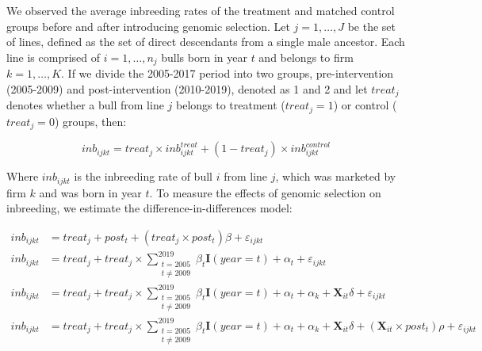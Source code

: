 \documentclass[12pt,letterpaper]{article}
\begin{document}


We observed the average inbreeding rates of the treatment and matched control groups before and after introducing genomic selection.  Let $j=1,\dots, J$ be the set of lines, defined as the set of direct descendants from a single male ancestor. Each line is comprised of $i=1,\dots,n_{j}$ bulls born in year $t$ and belongs to firm $k=1,\dots, K$. If we divide the 2005-2017 period into two groups, pre-intervention (2005-2009) and post-intervention (2010-2019), denoted as 1 and 2 and let $treat_{j}$ denotes whether a bull from line $j$ belongs to treatment ($treat_{j}=1$) or control ($treat_{j}=0$) groups, then:

\begin{equation*}
    inb_{ijkt}=treat_{j}\times inb_{ijkt}^{treat}+(1-treat_{j})\times inb_{ijkt}^{control}
\end{equation*}

Where $inb_{ijkt}$ is the inbreeding rate of bull $i$ from line $j$, which was marketed by firm $k$ and was born in year $t$. To measure the effects of genomic selection on inbreeding, we estimate the difference-in-differences model:

\begin{align}
    inb_{ijkt} &= treat_{j}+post_{t}+(treat_{j}\times post_{t})\beta+\varepsilon_{ijkt}\tag{Model 1}\\
    inb_{ijkt} &= treat_{j}+treat_{j}\times\sum_{\substack{t=2005\\t \neq 2009}}^{2019}\beta_{t}\mathbf{I}(year=t)+\alpha_{t}+\varepsilon_{ijkt}\tag{Model 2}\\
    inb_{ijkt} &= treat_{j}+treat_{j}\times\sum_{\substack{t=2005\\t \neq 2009}}^{2019}\beta_{t}\mathbf{I}(year=t)+\alpha_{t}+\alpha_{k}+\mathbf{X}_{it}\delta+\varepsilon_{ijkt}\tag{Model 3}\\
    inb_{ijkt} &= treat_{j}+treat_{j}\times\sum_{\substack{t=2005\\t \neq 2009}}^{2019}\beta_{t}\mathbf{I}(year=t)+\alpha_{t}+\alpha_{k}+\mathbf{X}_{it}\delta+\left(\mathbf{X}_{it}\times post_{t}\right)\rho+\varepsilon_{ijkt}\tag{Model 4}
    \end{align}
\end{document}
